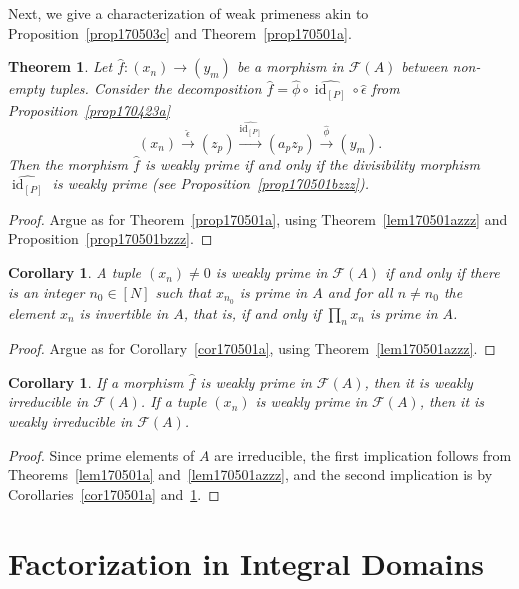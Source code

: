 \documentclass[reqno]{amsart}
\theoremstyle{plain}
\newtheorem{cor}[lem]{Corollary}
\newtheorem{thm}[lem]{Theorem}
\theoremstyle{definition}
\newcommand{\cat}[1]{\mathcal{#1}}
\newcommand{\catf}{\cat{F}}
\newcommand{\id}{\operatorname{id}}
\newcommand{\xra}{\xrightarrow}
\newcommand{\emptytuple}{\mathfrak{0}}
\numberwithin{equation}{lem}
\begin{document}
Next,
we give a characterization of 
weak primeness
akin to Proposition~\ref{prop170503c} and Theorem~\ref{prop170501a}.

\begin{thm}\label{prop170501azzz}
Let $\hat f\colon(x_n)\to (y_m)$ be a morphism in $\catf(A)$ between non-empty tuples.
Consider the decomposition $\hat f=\hat\phi\circ\widehat{\id_{[P]}}\circ\hat\epsilon$ from Proposition~\ref{prop170423a}
$$(x_n)\xra{\hat\epsilon}(z_p)\xra{\widehat{\id_{[P]}}}(a_pz_p)
\xra{\hat\phi}(y_m).$$
Then 
the morphism $\hat f$ is 
weakly
prime
if and only if the divisibility morphism
$\widehat{\id_{[P]}}$ is 
weakly
prime (see Proposition~\ref{prop170501bzzz}).
\end{thm}

\begin{proof}
Argue as for Theorem~\ref{prop170501a}, using Theorem~\ref{lem170501azzz} and Proposition~\ref{prop170501bzzz}.
\end{proof}

\begin{cor}\label{cor170501azzz}
A tuple $(x_n)\neq\emptytuple$ is 
weakly
prime in $\catf(A)$
if and only if
there is an integer $n_0\in[N]$ such that
$x_{n_0}$ is prime in $A$ and for all $n\neq n_0$ the element $x_n$ is invertible in $A$,
that is, if and only if $\prod_nx_n$ is prime in $A$.
\end{cor}

\begin{proof}
Argue as for Corollary~\ref{cor170501a}, using
Theorem~\ref{lem170501azzz}.
\end{proof}

\begin{cor}\label{cor170710a}
If a morphism $\hat f$ is 
weakly
prime in $\catf(A)$, then it is 
weakly
irreducible in $\catf(A)$.
If a tuple $(x_n)$ is 
weakly
prime in $\catf(A)$, then it is 
weakly
irreducible in $\catf(A)$.
\end{cor}

\begin{proof}
Since prime elements of $A$ are irreducible, 
the first implication follows from Theorems~\ref{lem170501a} and~\ref{lem170501azzz},
and the second implication is by Corollaries~\ref{cor170501a} and~\ref{cor170501azzz}.
\end{proof}



\section{Factorization in Integral Domains}\label{accp-implies-atomic}
\end{document}

